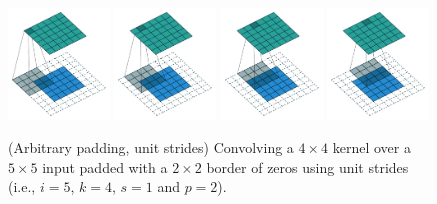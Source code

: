 \begin{figure}[p]
    \centering
    \includegraphics[width=0.24\textwidth]{pdf/arbitrary_padding_no_strides_00.pdf}
    \includegraphics[width=0.24\textwidth]{pdf/arbitrary_padding_no_strides_01.pdf}
    \includegraphics[width=0.24\textwidth]{pdf/arbitrary_padding_no_strides_02.pdf}
    \includegraphics[width=0.24\textwidth]{pdf/arbitrary_padding_no_strides_03.pdf}
    \caption{\label{fig:arbitrary_padding_no_strides} (Arbitrary padding, unit
        strides) Convolving a $4 \times 4$ kernel over a $5 \times 5$ input
        padded with a $2 \times 2$ border of zeros using unit strides (i.e.,
        $i = 5$, $k = 4$, $s = 1$ and $p = 2$).}
\end{figure}

